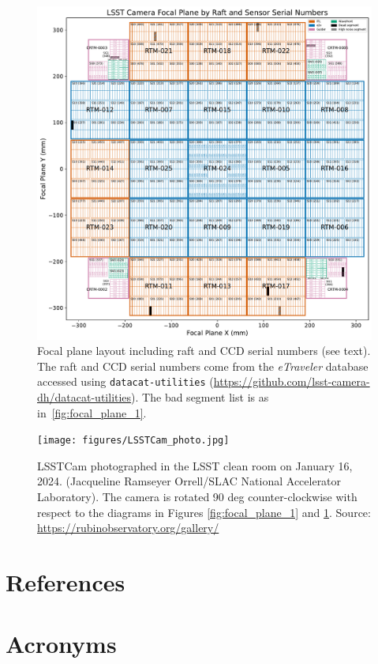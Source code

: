 \documentclass[OPS,authoryear,toc]{lsstdoc}
\begin{document}
\begin{figure}
  \centering
  \includegraphics[width=\textwidth]{figures/LSSTCam_focal_plane_CTN_001_FIG2.pdf}
	\caption{Focal plane layout including raft and CCD serial numbers (see text). The raft and CCD serial numbers come from the \emph{eTraveler} database accessed using {\tt{datacat-utilities}} (\url{https://github.com/lsst-camera-dh/datacat-utilities}). The bad segment list is as in~\ref{fig:focal_plane_1}.}
  \label{fig:focal_plane_2}
\end{figure}

\clearpage

\begin{figure}
  \centering
  \texttt{[image: figures/LSSTCam\_photo.jpg]}
  \caption{LSSTCam photographed in the LSST clean room on January 16, 2024. (Jacqueline Ramseyer Orrell/SLAC National Accelerator Laboratory). The camera is rotated 90 deg counter-clockwise with respect to the diagrams in Figures \ref{fig:focal_plane_1} and \ref{fig:focal_plane_2}. Source: \url{https://rubinobservatory.org/gallery/}}
  \label{fig:focal_plane_3}
\end{figure}

\appendix

\section{References} \label{sec:bib}
\renewcommand{\refname}{} %


\section{Acronyms} \label{sec:acronyms}

\end{document}
